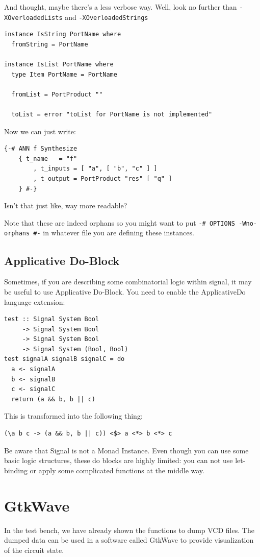 \documentclass[a4paper,12pt, oneside]{book}
\begin{document}
And thought, maybe there's a less verbose way. Well, look no further than \texttt{-XOverloadedLists} and \texttt{-XOverloadedStrings}

\begin{verbatim}
instance IsString PortName where
  fromString = PortName

instance IsList PortName where
  type Item PortName = PortName

  fromList = PortProduct ""

  toList = error "toList for PortName is not implemented"
\end{verbatim}

Now we can just write:

\begin{verbatim}
{-# ANN f Synthesize
    { t_name   = "f"
        , t_inputs = [ "a", [ "b", "c" ] ]
        , t_output = PortProduct "res" [ "q" ]
    } #-}
\end{verbatim}

Isn't that just like, way more readable?

Note that these are indeed orphans so you might want to put \texttt{{-# OPTIONS -Wno-orphans #-}} in whatever file you are defining these instances.

\section*{Applicative Do-Block}
Sometimes, if you are describing some combinatorial logic within signal, it may be useful to use Applicative Do-Block. You need to enable the ApplicativeDo language extension:
\begin{verbatim}
test :: Signal System Bool 
     -> Signal System Bool 
     -> Signal System Bool 
     -> Signal System (Bool, Bool)
test signalA signalB signalC = do
  a <- signalA
  b <- signalB
  c <- signalC
  return (a && b, b || c)
\end{verbatim}
This is transformed into the following thing:
\begin{verbatim}
(\a b c -> (a && b, b || c)) <$> a <*> b <*> c
\end{verbatim}
Be aware that Signal is not a Monad Instance. Even though you can use some basic logic structures, these do blocks are highly limited: you can not use let-binding or apply some complicated functions at the middle way.
\chapter{GtkWave}
In the test bench, we have already shown the functions to dump VCD files. The dumped data can be used in a software called GtkWave to provide visualization of the circuit state.
\end{document}
